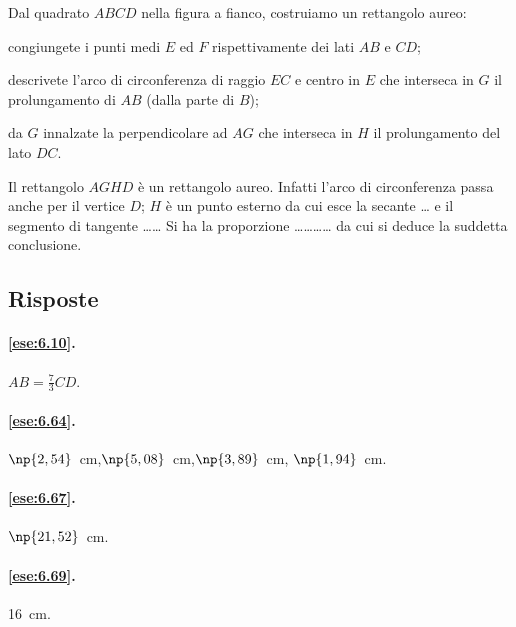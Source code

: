 \noindent\begin{minipage}{0.7\textwidth}\parindent15pt
\begin{esercizio}
\label{ese:6.112}
Dal quadrato \(ABCD\) nella figura a fianco, costruiamo un rettangolo 
aureo:
\begin{enumerate*}
\item congiungete i punti medi \(E\) ed \(F\) rispettivamente dei lati 
\(AB\) e \(CD\);
\item descrivete l'arco di circonferenza di raggio \(EC\) e centro in 
\(E\) che interseca in \(G\) il prolungamento di \(AB\) (dalla parte di 
\(B\));
\item da \(G\) innalzate la perpendicolare ad \(AG\) che interseca in \(H\) 
il prolungamento del lato \(DC\).
\end{enumerate*}
Il rettangolo \(AGHD\) è un rettangolo aureo. Infatti l'arco di 
circonferenza passa anche per il vertice \(D\); \(H\) è un punto esterno 
da cui esce la secante \ldots{} e il segmento di tangente 
\ldots\ldots{}
Si ha la proporzione \ldots\ldots\ldots\ldots{} da cui si deduce la 
suddetta conclusione.
\end{esercizio}
\end{minipage}\hfil
\begin{minipage}{0.3\textwidth}
	\centering
\end{minipage}


\subsection{Risposte}

\begingroup
\hypersetup{linkcolor=black}

\paragraph{\ref{ese:6.10}.}
\(AB=\frac{7}{3}CD\).

\paragraph{\ref{ese:6.64}.}
\(\np{2,54}\)~cm,\quad \(\np{5,08}\)~cm,\quad \(\np{3,89}\)~cm,\quad 
\(\np{1,94}\)~cm.

\paragraph{\ref{ese:6.67}.}
\(\np{21,52}\)~cm.

\paragraph{\ref{ese:6.69}.}
16~cm.

